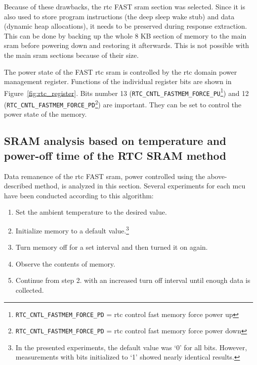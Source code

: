 Because of these drawbacks, the \gls{rtc} FAST \gls{sram} section was selected. Since it is also used to store program instructions (the deep sleep wake stub) and data (dynamic heap allocations), it needs to be preserved during response extraction. This can be done by backing up the whole 8 KB section of memory to the main \gls{sram} before powering down and restoring it afterwards. This is not possible with the main \gls{sram} sections because of their size.

The power state of the FAST \gls{rtc} \gls{sram} is controlled by the \gls{rtc} domain power management register. Functions of the individual register bits are shown in Figure~\ref{fig:rtc_register}. Bits number 13 (\lstinline{RTC_CNTL_FASTMEM_FORCE_PU}\footnote{\lstinline{RTC_CNTL_FASTMEM_FORCE_PD} = \gls{rtc} control fast memory force power up}) and 12 (\lstinline{RTC_CNTL_FASTMEM_FORCE_PD}\footnote{\lstinline{RTC_CNTL_FASTMEM_FORCE_PD} = \gls{rtc} control fast memory force power down}) are important. They can be set to control the power state of the memory.~\cite{esp322021}

\subsection[SRAM analysis based on temperature and power-off time]{SRAM analysis based on temperature and power-off time of the RTC SRAM method}\label{sec:rtc_analysis}

Data remanence of the \gls{rtc} FAST \gls{sram}, power controlled using the above-described method, is analyzed in this section. Several experiments for each \gls{mcu} have been conducted according to this algorithm:

\begin{enumerate}
    \item Set the ambient temperature to the desired value.
    \item Initialize memory to a default value.\footnote{In the presented experiments, the default value was `0' for all bits. However, measurements with bits initialized to `1' showed nearly identical results.}
    \item Turn memory off for a set interval and then turned it on again.
    \item Observe the contents of memory.
    \item Continue from step 2. with an increased turn off interval until enough data is collected.
\end{enumerate}

